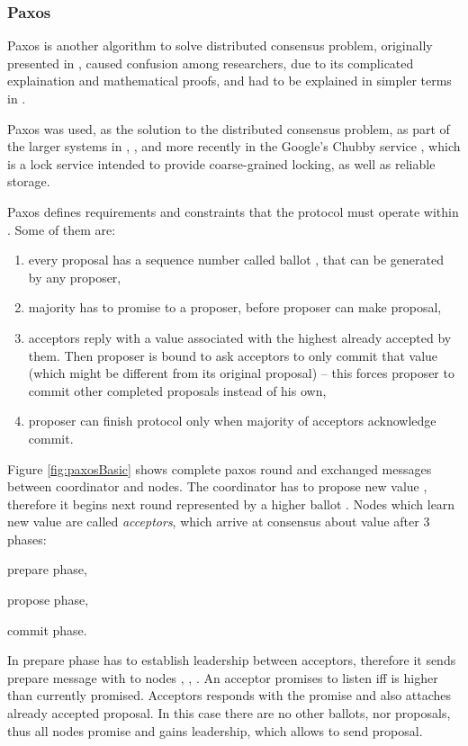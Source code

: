 

\subsubsection{Paxos}
Paxos is another algorithm to solve distributed consensus problem, originally presented in \cite{Lamport1998partTimeParliment}, caused confusion among researchers, due to its complicated explaination and mathematical proofs, and had to be explained in simpler terms in \cite{lamport2001paxosMadeSimple}. 

Paxos was used, as the solution to the distributed consensus problem, as part of the larger systems in \cite{chandra2007PaxosMadeLive}, \cite{lampson1996build}, and more recently in the Google's Chubby service \cite{burrows2006chubby}, which is a lock service intended to provide coarse-grained locking, as well as reliable storage. 

Paxos defines requirements and constraints that the protocol must operate within \cite{lamport2001paxosMadeSimple}. Some of them are: \begin{enumerate}
  \item every proposal has a sequence number called ballot \ballot, that can be generated by any proposer,
  \item majority has to promise to a proposer, before proposer can make proposal,
  \item acceptors reply with a value associated with the highest \ballot already accepted by them. Then proposer is bound to ask acceptors to only commit that value (which might be different from its original proposal) -- this forces proposer to commit other completed proposals instead of his own,\label{sec:mpp:requirements:finishInProgress}
  \item proposer can finish protocol only when majority of acceptors acknowledge commit.
\end{enumerate}

Figure \ref{fig:paxosBasic} shows complete paxos round and exchanged messages between coordinator and nodes. The coordinator \coordinator has to propose new value \paxosValue, therefore it begins next \paxos round represented by a higher ballot \ballot. Nodes which learn new value are called \emph{acceptors}, which arrive at consensus about value \paxosValue after $3$ phases:
\begin{enumerate*}[label=(\alph*)]
\item prepare phase,
\item propose phase,
\item commit phase.
\end{enumerate*}
In prepare phase \coordinator has to establish leadership between acceptors, therefore it sends prepare message with \ballot to nodes , , . An acceptor promises to listen iff \ballot is higher than currently promised. Acceptors responds with the promise and also attaches already accepted proposal. In this case there are no other ballots, nor proposals, thus all nodes promise and \coordinator gains leadership, which allows \coordinator to send proposal.

